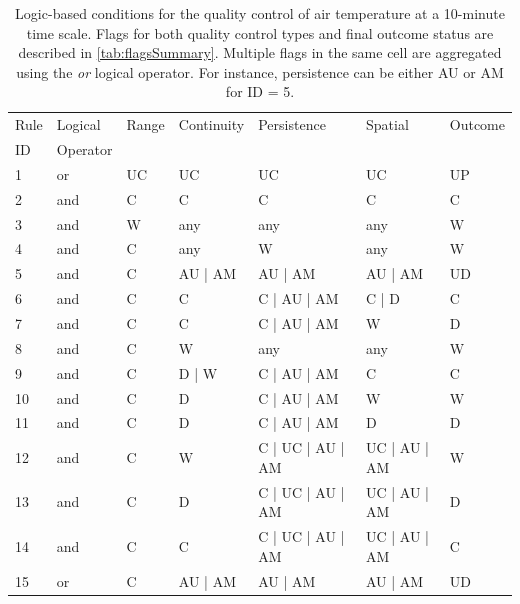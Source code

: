 \documentclass[authoryear,preprint,review,12pt]{elsarticle}
\begin{document}
\begin{table}[h]
    \begin{scriptsize}
    \centering
    \begin{tabular}{l l l l l l l}
        \hline
      Rule & Logical  & Range & Continuity & Persistence      & Spatial      & Outcome \\
        ID & Operator &       &            &                  &              &         \\
        \hline
        1  & or               & UC    & UC         & UC               & UC           & UP \\
        2  & and              & C     & C          & C                & C            & C  \\
        3  & and              & W     & any        & any              & any          & W  \\
        4  & and              & C     & any        & W                & any          & W  \\
        5  & and              & C     & AU | AM    & AU | AM          & AU | AM      & UD \\
        6  & and              & C     & C          & C | AU | AM      & C | D        & C  \\
        7  & and              & C     & C          & C | AU | AM      & W            & D  \\
        8  & and              & C     & W          & any              & any          & W  \\
        9  & and              & C     & D | W      & C | AU | AM      & C            & C  \\
        10 & and              & C     & D          & C | AU | AM      & W            & W  \\
        11 & and              & C     & D          & C | AU | AM      & D            & D  \\
        12 & and              & C     & W          & C | UC | AU | AM & UC | AU | AM & W  \\
        13 & and              & C     & D          & C | UC | AU | AM & UC | AU | AM & D  \\
        14 & and              & C     & C          & C | UC | AU | AM & UC | AU | AM & C  \\
        15 & or               & C     & AU | AM    & AU | AM          & AU | AM      & UD \\
        \hline
    \end{tabular}
    \end{scriptsize}
    \caption{Logic-based conditions for the quality control of air temperature at a 10-minute time scale.
    Flags for both quality control types and final outcome status are described in \cref{tab:flagsSummary}.
    Multiple flags in the same cell are aggregated using the \textit{or} logical operator.
    For instance, persistence can be either AU or AM for ID = 5. }
    \label{tab:qcheck_m10_airT}
\end{table}
\end{document}
